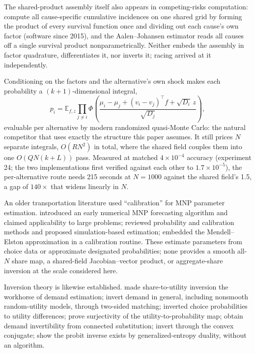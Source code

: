 \documentclass[12pt]{article}
\theoremstyle{remark}
\newcommand{\E}{\mathbb{E}}
\begin{document}
The shared-product assembly itself also appears in competing-risks
computation: \citet{mahani2019} compute all cause-specific cumulative
incidences on one shared grid by forming the product of every survival
function once and dividing out each cause's own factor (software since
2015), and the Aalen--Johansen estimator \citep{aalen1978} reads all
causes off a single survival product nonparametrically. Neither embeds
the assembly in factor quadrature, differentiates it, nor inverts it;
racing arrived at it independently.

Conditioning on the factors and the alternative's own shock makes each
probability a $(k{+}1)$-dimensional integral,
\[
p_i = \E_{f,z} \prod_{j \ne i}
\Phi\!\left(\frac{\mu_i - \mu_j + (v_i - v_j)^\top f +
\sqrt{D_i}\,z}{\sqrt{D_j}}\right),
\]
evaluable per alternative by modern randomized quasi-Monte Carlo: the
natural competitor that uses exactly the structure this paper assumes. It
still prices $N$ separate integrals, $O(RN^2)$ in total, where the shared
field couples them into one $O(QN(k+L))$ pass. Measured at matched
$4\times10^{-4}$ accuracy (experiment 24; the two implementations first
verified against each other to $1.7\times10^{-5}$), the per-alternative
route needs 215 seconds at $N = 1000$ against the shared field's 1.5,
a gap of $140\times$ that widens linearly in $N$.

An older transportation literature used ``calibration'' for MNP
parameter estimation. \citet{daganzo1977} introduced an early numerical
MNP forecasting algorithm and claimed applicability to large problems;
\citet{sheffi1982} reviewed probability and calibration methods and
proposed simulation-based estimation; \citet{kamakura1989} embedded the
Mendell--Elston approximation in a calibration routine. These estimate
parameters from choice data or approximate designated probabilities;
none provides a smooth all-$N$ share map, a shared-field
Jacobian--vector product, or aggregate-share inversion at the scale
considered here.

Inversion theory is likewise established. \citet{berry1994} made
share-to-utility inversion the workhorse of demand estimation;
\citet{bonnet2022} invert demand in general, including nonsmooth
random-utility models, through two-sided matching;
\citet{hotz1993}
inverted choice probabilities to utility differences; \citet{norets2013}
prove surjectivity of the utility-to-probability map;
\citet{bgh2013} obtain demand invertibility from
connected substitution;
\citet{chiong2016} invert through the convex
conjugate; \citet{fosgerau2020} show the probit inverse exists by
generalized-entropy duality, without an algorithm.
\end{document}
